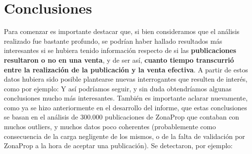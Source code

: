 \documentclass[
10pt, %
a4paper, %
oneside, %
headinclude,footinclude, %
BCOR5mm, %
]{scrartcl}
\begin{document}

\newpage
\section{Conclusiones}
    Para comenzar es importante destacar que, si bien consideramos que el análisis realizado fue bastante profundo, se podrían haber hallado resultados m\'as interesantes si se hubiera tenido información respecto de si las \textbf{publicaciones resultaron o no en una venta}, y de ser así, \textbf{cuanto tiempo transcurrió entre la realización de la publicación y la venta efectiva}. A partir de estos datos hubiera sido posible plantearse nuevas interrogantes que resulten de inter\'es, como por ejemplo:  Y as\'i podr\'iamos seguir, y sin duda obtendr\'iamos algunas conclusiones mucho m\'as interesantes.
    \vskip 2mm
    Tambi\'en es importante aclarar nuevamente, como ya se hizo anteriormente en el desarrollo del informe, que estas conclusiones se basan en el an\'alisis de 300.000 publicaciones de ZonaProp que contaban con muchos outliers, y muchos datos poco coherentes (probablemente como consecuencia de la carga negligente de los mismos, o de la falta de validaci\'on por ZonaProp a la hora de aceptar una publicaci\'on). Se detectaron, por ejemplo:
    
\end{document}
